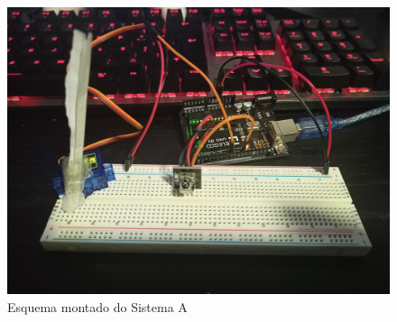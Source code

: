 \begin{figure}[H]
    \centering
    \includegraphics[scale=0.05]{images/hardware/sisC_IRL.jpg}
    \caption{Esquema montado do Sistema A}
\end{figure}